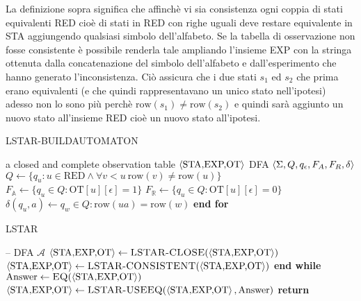 La definizione sopra significa che affinchè vi sia consistenza ogni coppia di stati equivalenti RED cioè di stati in RED con righe uguali deve restare equivalente in STA aggiungendo qualsiasi simbolo dell'alfabeto. 
Se la tabella di osservazione non fosse consistente è possibile renderla tale ampliando l'insieme EXP con la stringa ottenuta dalla concatenazione del simbolo dell'alfabeto e dall'esperimento che hanno generato l'inconsistenza. Ciò assicura che i due stati $s_1$ ed $s_2$ che prima erano equivalenti (e che quindi rappresentavano un unico stato nell'ipotesi) adesso non lo sono più perchè  $\text{row}(s_1) \neq \text{row}(s_2)$ e quindi sarà aggiunto un nuovo stato all'insieme RED cioè un nuovo stato all'ipotesi.

\begin{algorithm}
\caption{LSTAR-BUILDAUTOMATON}\label{alg:lstar-buildautomaton}
\begin{algorithmic}[1]
\Statex
\Input a closed and complete observation table $\Braket{\text{STA,EXP,OT}}$
\Output DFA $\Braket{\Sigma,Q,q_\epsilon,F_A,F_R,\delta}$
\State $Q \gets \{q_u : u \in \text{RED} \land \forall v < u \: \text{row}(v) \ne \text{row}(u)\}$
\State $F_{\mathbb{A}} \gets \{q_u \in Q : \text{OT}[u][\epsilon] = 1\}$
\State $F_{\mathbb{R}} \gets \{q_u \in Q : \text{OT}[u][\epsilon] = 0\}$
      $\delta(q_u,a) \gets q_w \in Q : \text{row}(ua) = \text{row}(w)$
     \EndFor
\EndFor
\State \textbf{end for}
\State {}
\end{algorithmic}
\end{algorithm}

\begin{algorithm}
\caption{LSTAR}\label{alg:lstar}
\begin{algorithmic}[1]
\Statex
\Input --
\Output DFA $\mathcal{A}$
\State {}
\Repeat
          \vspace{0.5mm}
               \State $\Braket{\text{STA,EXP,OT}} \gets \Call{LSTAR-CLOSE}{\Braket{\text{STA,EXP,OT}}} $
          \EndIf
          \vspace{0.5mm}
               \State $\Braket{\text{STA,EXP,OT}} \gets \Call{LSTAR-CONSISTENT}{\Braket{\text{STA,EXP,OT}}} $ 
          \EndIf    
     \EndWhile
     \State \textbf{end while}
     \State $\text{Answer} \gets \Call{EQ}{\Braket{\text{STA,EXP,OT}}}$
          \vspace{0.25mm}
          \State $\Braket{\text{STA,EXP,OT}} \gets \Call{LSTAR-USEEQ}{\Braket{\text{STA,EXP,OT}},\text{Answer}}$
     \EndIf
{}
\State \textbf{return} 
\end{algorithmic}
\end{algorithm}

